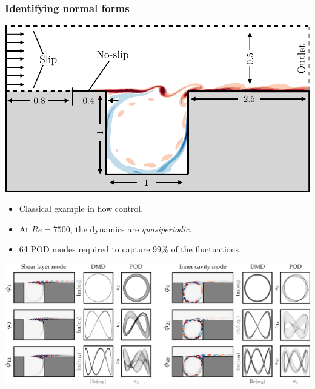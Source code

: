 \documentclass[aspectratio=169,compress,12pt]{beamer}
\begin{document}


\begin{frame}
    \frametitle{Identifying normal forms}
    \vfill
    \begin{minipage}{.38\textwidth}
        \centering
        \includegraphics[width=\textwidth]{imgs/cavity_geomtry.png}
    \end{minipage}%
    \hfill
    \begin{minipage}{.58\textwidth}
        \begin{itemize}
            \item Classical example in flow control.
            \par\bigskip
            \item At $Re = 7500$, the dynamics are \emph{quasiperiodic}.
            \par\bigskip
            \item 64 POD modes required to capture 99\% of the fluctuations.
        \end{itemize}
    \end{minipage}
    \vfill
\end{frame}

\begin{frame}
    \vfill
    \centering
    \includegraphics[width=\textwidth]{imgs/pod_modes.png}
    \vfill
\end{frame}
\end{document}
